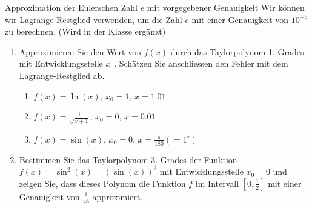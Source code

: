 \begin{bsp}
	{Approximation der Eulerschen Zahl $e$ mit vorgegebener Genauigkeit}{}
	Wir können wir Lagrange-Restglied verwenden, um die Zahl \(e\) mit einer Genauigkeit von \(10^{-6}\) zu berechnen. (Wird in der Klasse ergänzt)

	\vspace{13cm}

\end{bsp}
\clearpage
\begin{ueb}
	{}{}
	\begin{enumerate}
		\item 	Approximieren Sie den Wert von $f(x)$ durch das Taylorpolynom 1. Grades mit Entwicklungsstelle $x_0$. Schätzen Sie anschliessen den Fehler mit dem Lagrange-Restglied ab.
		      \begin{enumerate}
			      \item 	$f(x)=\ln(x), \, x_0=1, \,   x=1.01$
			      \item  	$f(x)=\frac{1}{\sqrt{x+1}}, \, x_0=0, \,   x=0.01$
			      \item  $f(x)=\sin(x), \, x_0=0,  \,  x= \frac{\pi}{180} \left(= 1^\circ\right)$
		      \end{enumerate}
		\item  	Bestimmen Sie das Taylorpolynom 3. Grades der Funktion $f(x)=\sin^2(x)=(\sin(x) )^2$ mit Entwicklungsstelle $x_0=0$ und zeigen Sie, dass dieses Polynom die Funktion $f$ im Intervall $\left[0,\frac{1}{2}\right]$ mit einer Genauigkeit von $\frac{1}{48}$ approximiert.

	\end{enumerate}
\end{ueb}

